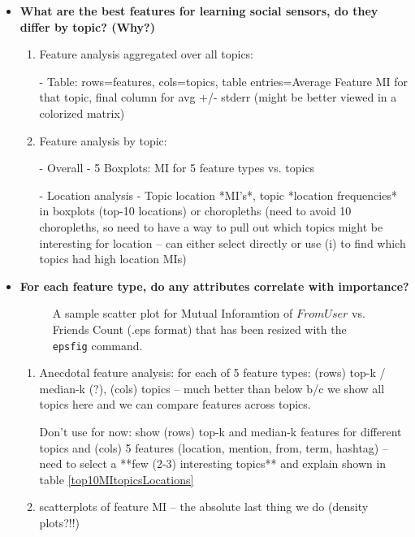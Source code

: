 \documentclass[letterpaper]{article}
\begin{document}
\begin{itemize}
\item \textbf{What are the best features for learning social sensors, do they differ by topic?  (Why?)}
\begin{enumerate}
\item Feature analysis aggregated over all topics: 

- Table: rows=features, cols=topics, table entries=Average Feature MI for that topic, final column for avg +/- stderr (might be better viewed in a colorized matrix)

\item Feature analysis by topic:

- Overall - 5 Boxplots: MI for 5 feature types vs. topics

- Location analysis - Topic location *MI's*, topic *location frequencies* in boxplots (top-10 locations) or choropleths (need to avoid 10 choropleths, so need to have a way to pull out which topics might be interesting for location -- can either select directly or use (i) to find which topics had high location MIs)
\end{enumerate}

\item \textbf{For each feature type, do any attributes correlate with importance?}

\begin{figure}[h]
\centering
{}
\caption{A sample scatter plot for Mutual Inforamtion of $FromUser$ vs. Friends Count (.eps format)
that has been resized with the \texttt{epsfig} command.}
\end{figure}

\begin{enumerate}
\item Anecdotal feature analysis: for each of 5 feature types: (rows) top-k / median-k (?), (cols) topics -- much better than below b/c we show all topics here and we can compare features across topics.

Don't use for now: show (rows) top-k and median-k features for different topics and (cols) 5 features (location, mention, from, term, hashtag) -- need to select a **few (2-3) interesting topics** and explain shown in table \ref{top10MItopicsLocations}

\item scatterplots of feature MI -- the absolute last thing we do (density plots?!!)


\end{enumerate}
\end{itemize}
\end{document}
